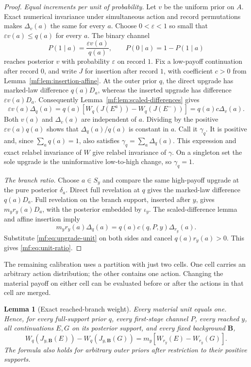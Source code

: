 \documentclass[11pt,a4paper]{article}
\newtheorem{lemma}[theorem]{Lemma}
\theoremstyle{definition}
\newcommand{\1}{\mathbf 1}
\begin{document}
\begin{proof}
\emph{Equal increments per unit of probability.}
Let $v$ be the uniform prior on $A$.  Exact numerical invariance under
simultaneous action and record permutations makes $\Delta_v(a)$ the same
for every $a$.  Choose $0<\varepsilon<1$ so small that
$\varepsilon v(a)\le q(a)$ for every $a$.  The binary channel
\[
 P(1\mid a)=\frac{\varepsilon v(a)}{q(a)},\qquad
 P(0\mid a)=1-P(1\mid a)
\]
reaches posterior $v$ with probability $\varepsilon$ on record $1$.
Fix a low-payoff continuation after record $0$, and write $J$ for insertion
after record $1$, with coefficient $c>0$ from
Lemma~\ref{mf:lem:insertion-affine}.  At the outer prior $q$, the direct
upgrade has marked-law difference $q(a)D_a$, whereas the inserted upgrade
has difference $\varepsilon v(a)D_a$.  Consequently
Lemma~\ref{mf:lem:scaled-differences} gives
\[
 \varepsilon v(a)\Delta_q(a)
 =q(a)[W_q(J(E^a))-W_q(J(E^-))]
 =q(a)c\Delta_v(a).
\]
Both $v(a)$ and $\Delta_v(a)$ are independent of $a$.  Dividing by the
positive $\varepsilon v(a)q(a)$ shows that $\Delta_q(a)/q(a)$ is constant
in $a$.  Call it $\gamma_q$.  It is positive and, since $\sum_a q(a)=1$,
also satisfies $\gamma_q=\sum_a\Delta_q(a)$.  This expression and exact
relabel invariance of $W$ give relabel invariance of $\gamma$.  On a
singleton set the sole upgrade is the uninformative low-to-high change,
so $\gamma_q=1$.

\emph{The branch ratio.}
Choose $a\in S_y$ and compare the same high-payoff upgrade at the pure
posterior $\delta_a$.  Direct full revelation at $q$ gives the marked-law
difference $q(a)D_a$.  Full revelation on the branch support, inserted
after $y$, gives $m_y r_y(a)D_a$, with the posterior embedded by
$\iota_y$.  The scaled-difference lemma and affine insertion imply
\[
 m_y r_y(a)\Delta_q(a)
 =q(a)c(q,P,y)\Delta_{r_y}(a).
\]
Substitute \eqref{mf:eq:upgrade-unit} on both sides and cancel
$q(a)r_y(a)>0$.  This gives \eqref{mf:eq:unit-ratio}.
\end{proof}

The remaining calibration uses a partition with just two cells.  One cell
carries an arbitrary action distribution; the other contains one action.
Changing the material payoff on either cell can be evaluated before or
after the actions in that cell are merged.

\begin{lemma}[Exact reached-branch weight]\label{lf:lem:branch-weight}
Every material unit equals one.  Hence, for every full-support prior $q$,
every first-stage channel $P$, every reached $y$, all continuations $E,G$
on its posterior support, and every fixed background $\mathbf B$,
\begin{equation}
 W_q(J_{y,\mathbf B}(E))-W_q(J_{y,\mathbf B}(G))
 =m_y[W_{r_y}(E)-W_{r_y}(G)].
 \label{lf:eq:branch-weight}
\end{equation}
The formula also holds for arbitrary outer priors after restriction to
their positive supports.
\end{lemma}
\end{document}
